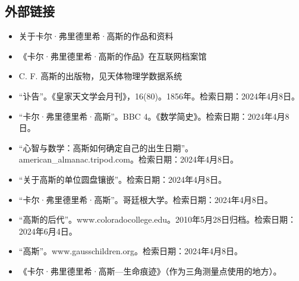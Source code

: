 \subsection{外部链接}
\begin{itemize}
\item 关于卡尔·弗里德里希·高斯的作品和资料
\item 《卡尔·弗里德里希·高斯的作品》在互联网档案馆
\item C. F. 高斯的出版物，见天体物理学数据系统
\item “讣告”。《皇家天文学会月刊》，16(80)。1856年。检索日期：2024年4月8日。
\item “卡尔·弗里德里希·高斯”。BBC 4。《数学简史》。检索日期：2024年4月8日。
\item “心智与数学：高斯如何确定自己的出生日期”。american_almanac.tripod.com。检索日期：2024年4月8日。
\item “关于高斯的单位圆盘镶嵌”。检索日期：2024年4月8日。
\item “卡尔·弗里德里希·高斯”。哥廷根大学。检索日期：2024年4月8日。
\item “高斯的后代”。www.coloradocollege.edu。2010年5月28日归档。检索日期：2024年6月4日。
\item “高斯”。www.gausschildren.org。检索日期：2024年4月8日。
\item 《卡尔·弗里德里希·高斯—生命痕迹》（作为三角测量点使用的地方）。
\end{itemize}

